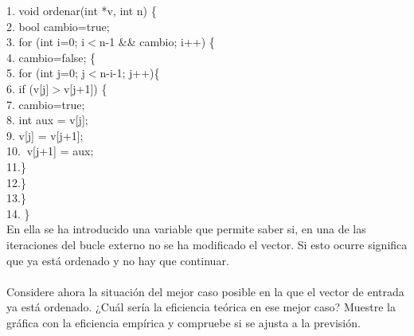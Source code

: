 \documentclass[titlepage, 12pt,a4paper]{article}
\begin{document}
  \hspace*{1cm}1. void ordenar(int *v, int n) \{ \\
  \hspace*{1cm}2.\hspace*{2em}  bool cambio=true;\\
  \hspace*{1cm}3.\hspace*{2em} 	for (int i=0; i$<$n-1 \&\& cambio; i++) \{ \\
  \hspace*{1cm}4.\hspace*{4em}      cambio=false; \{\\
  \hspace*{1cm}5.\hspace*{4em}      for (int j=0; j$<$n-i-1; j++)\{ \\
  \hspace*{1cm}6.\hspace*{6em}        if (v[j]$>$v[j+1]) \{\\
  \hspace*{1cm}7.\hspace*{8em}        cambio=true;\\
  \hspace*{1cm}8.\hspace*{8em}		  int aux = v[j]; \\
  \hspace*{1cm}9.\hspace*{8em}		  v[j] = v[j+1]; \\
  \hspace*{1cm}10.\hspace*{7em}		  $\ $v[j+1] = aux; \\
  \hspace*{1cm}11.\hspace*{6em}\} \\
  \hspace*{1cm}12.\hspace*{4em}\} \\
  \hspace*{1cm}13.\hspace*{2em}\} \\
  \hspace*{1cm}14. \}  \vspace {1em} \\

En ella se ha introducido una variable que permite saber si, en una de las iteraciones del bucle externo no se ha modificado el vector. Si esto ocurre significa que ya está ordenado y no hay que continuar.\\\\
Considere ahora la situación del mejor caso posible en la que el vector de entrada ya está ordenado. ¿Cuál sería la eficiencia teórica en ese mejor caso? Muestre la gráfica con la eficiencia empírica y compruebe si se ajusta a la previsión.
\\
\end{document}
